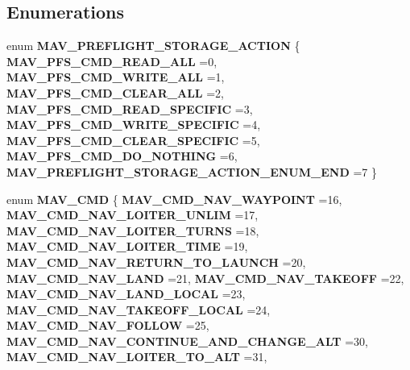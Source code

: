 \subsection*{Enumerations}
\begin{DoxyCompactItemize}
\item 
enum \textbf{ M\+A\+V\+\_\+\+P\+R\+E\+F\+L\+I\+G\+H\+T\+\_\+\+S\+T\+O\+R\+A\+G\+E\+\_\+\+A\+C\+T\+I\+ON} \{ \newline
\textbf{ M\+A\+V\+\_\+\+P\+F\+S\+\_\+\+C\+M\+D\+\_\+\+R\+E\+A\+D\+\_\+\+A\+LL} =0, 
\textbf{ M\+A\+V\+\_\+\+P\+F\+S\+\_\+\+C\+M\+D\+\_\+\+W\+R\+I\+T\+E\+\_\+\+A\+LL} =1, 
\textbf{ M\+A\+V\+\_\+\+P\+F\+S\+\_\+\+C\+M\+D\+\_\+\+C\+L\+E\+A\+R\+\_\+\+A\+LL} =2, 
\textbf{ M\+A\+V\+\_\+\+P\+F\+S\+\_\+\+C\+M\+D\+\_\+\+R\+E\+A\+D\+\_\+\+S\+P\+E\+C\+I\+F\+IC} =3, 
\newline
\textbf{ M\+A\+V\+\_\+\+P\+F\+S\+\_\+\+C\+M\+D\+\_\+\+W\+R\+I\+T\+E\+\_\+\+S\+P\+E\+C\+I\+F\+IC} =4, 
\textbf{ M\+A\+V\+\_\+\+P\+F\+S\+\_\+\+C\+M\+D\+\_\+\+C\+L\+E\+A\+R\+\_\+\+S\+P\+E\+C\+I\+F\+IC} =5, 
\textbf{ M\+A\+V\+\_\+\+P\+F\+S\+\_\+\+C\+M\+D\+\_\+\+D\+O\+\_\+\+N\+O\+T\+H\+I\+NG} =6, 
\textbf{ M\+A\+V\+\_\+\+P\+R\+E\+F\+L\+I\+G\+H\+T\+\_\+\+S\+T\+O\+R\+A\+G\+E\+\_\+\+A\+C\+T\+I\+O\+N\+\_\+\+E\+N\+U\+M\+\_\+\+E\+ND} =7
 \}
\item 
enum \textbf{ M\+A\+V\+\_\+\+C\+MD} \{ \newline
\textbf{ M\+A\+V\+\_\+\+C\+M\+D\+\_\+\+N\+A\+V\+\_\+\+W\+A\+Y\+P\+O\+I\+NT} =16, 
\textbf{ M\+A\+V\+\_\+\+C\+M\+D\+\_\+\+N\+A\+V\+\_\+\+L\+O\+I\+T\+E\+R\+\_\+\+U\+N\+L\+IM} =17, 
\textbf{ M\+A\+V\+\_\+\+C\+M\+D\+\_\+\+N\+A\+V\+\_\+\+L\+O\+I\+T\+E\+R\+\_\+\+T\+U\+R\+NS} =18, 
\textbf{ M\+A\+V\+\_\+\+C\+M\+D\+\_\+\+N\+A\+V\+\_\+\+L\+O\+I\+T\+E\+R\+\_\+\+T\+I\+ME} =19, 
\newline
\textbf{ M\+A\+V\+\_\+\+C\+M\+D\+\_\+\+N\+A\+V\+\_\+\+R\+E\+T\+U\+R\+N\+\_\+\+T\+O\+\_\+\+L\+A\+U\+N\+CH} =20, 
\textbf{ M\+A\+V\+\_\+\+C\+M\+D\+\_\+\+N\+A\+V\+\_\+\+L\+A\+ND} =21, 
\textbf{ M\+A\+V\+\_\+\+C\+M\+D\+\_\+\+N\+A\+V\+\_\+\+T\+A\+K\+E\+O\+FF} =22, 
\textbf{ M\+A\+V\+\_\+\+C\+M\+D\+\_\+\+N\+A\+V\+\_\+\+L\+A\+N\+D\+\_\+\+L\+O\+C\+AL} =23, 
\newline
\textbf{ M\+A\+V\+\_\+\+C\+M\+D\+\_\+\+N\+A\+V\+\_\+\+T\+A\+K\+E\+O\+F\+F\+\_\+\+L\+O\+C\+AL} =24, 
\textbf{ M\+A\+V\+\_\+\+C\+M\+D\+\_\+\+N\+A\+V\+\_\+\+F\+O\+L\+L\+OW} =25, 
\textbf{ M\+A\+V\+\_\+\+C\+M\+D\+\_\+\+N\+A\+V\+\_\+\+C\+O\+N\+T\+I\+N\+U\+E\+\_\+\+A\+N\+D\+\_\+\+C\+H\+A\+N\+G\+E\+\_\+\+A\+LT} =30, 
\textbf{ M\+A\+V\+\_\+\+C\+M\+D\+\_\+\+N\+A\+V\+\_\+\+L\+O\+I\+T\+E\+R\+\_\+\+T\+O\+\_\+\+A\+LT} =31, 

\end{DoxyCompactItemize}
